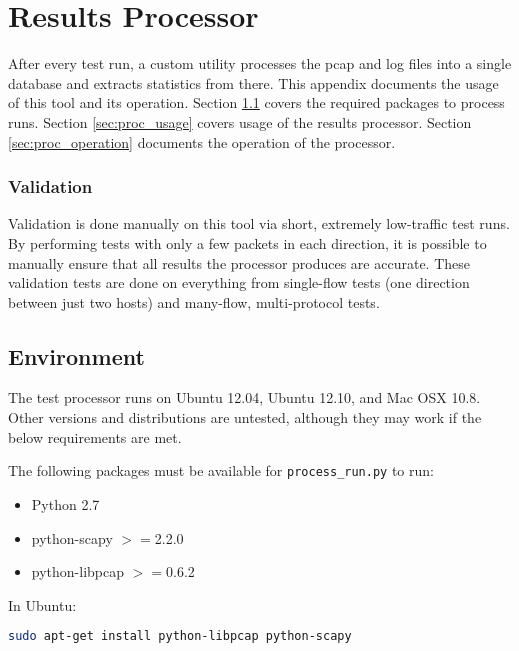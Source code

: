 \chapter{Results Processor}
\label{chp:processor}

\par After every test run, a custom utility processes the pcap and log files into a single database and extracts statistics from there. This appendix documents the usage of this tool and its operation. Section \ref{sec:proc_env} covers the required packages to process runs. Section \ref{sec:proc_usage} covers usage of the results processor. Section \ref{sec:proc_operation} documents the operation of the processor.

\subsection{Validation}
\par Validation is done manually on this tool via short, extremely low-traffic test runs. By performing tests with only a few packets in each direction, it is possible to manually ensure that all results the processor produces are accurate. These validation tests are done on everything from single-flow tests (one direction between just two hosts) and many-flow, multi-protocol tests.

\section{Environment}
\label{sec:proc_env}
\par The test processor runs on Ubuntu 12.04, Ubuntu 12.10, and Mac OSX 10.8. Other versions and distributions are untested, although they may work if the below requirements are met. 

\par The following packages must be available for \texttt{process\_run.py} to run:
{\singlespace
\begin{itemize}
\item Python 2.7
\item python-scapy $>=$2.2.0
\item python-libpcap $>=$0.6.2
\end{itemize}
}

\par In Ubuntu:
\begin{lstlisting}[language=bash]
sudo apt-get install python-libpcap python-scapy
\end{lstlisting}

